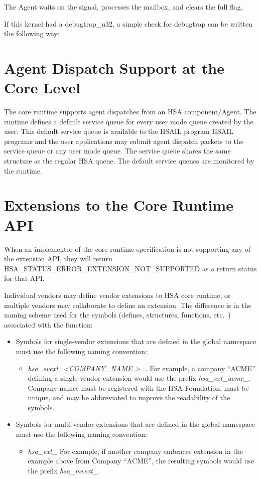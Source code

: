 \documentclass{book}
\newcommand{\reftyp}[1]{#1}
\newcommand{\refenu}[1]{\reftyp{#1}}
\begin{document}
The Agent waits on the signal, processes the mailbox, and clears
the full flag.

If this kernel had a debugtrap\-\_\-u32, a simple check for
debugtrap can be written the following way:




\hypertarget{coreapi_agent}{}\section{Agent Dispatch Support at the
Core Level}\label{coreapi_agent} The core runtime supports agent
dispatches from an HSA component/Agent. The runtime defines a
default service queue for every user mode queue created by the user.
This default service queue is available to the HSAIL program HSAIL
programs and the user applications may submit agent dispatch packets
to the service queue or any user mode queue.  The service queue
shares the same structure as the regular HSA queue.  The default
service queues are monitored by the runtime.



\hypertarget{extensions}{}\section{Extensions to the
Core Runtime API}\label{extensions}

When an implementor of the core runtime specification is not
supporting any of the extension API, they will return
\refenu{HSA\_STATUS\_ERROR\_EXTENSION\_NOT\_SUPPORTED} as a return
status for that API.

Individual vendors may define vendor extensions to HSA core runtime,
or multiple vendors may collaborate to define an extension. The
difference is in the naming scheme used for the symbols (defines,
structures, functions, etc.\ ) associated with the function:

\begin{itemize}
\item Symbols for single-vendor extensions that are defined in the
global namespace must use the following naming convention:
  \begin{itemize}
    \item \emph{hsa\_svext\_\textless COMPANY\_NAME \textgreater\_}.
    For example, a company ``ACME'' defining a single-vendor extension
    would use the prefix \emph{hsa\_ext\_acme\_}. Company names must
    be registered with the HSA Foundation, must be unique, and may be
    abbreviated to improve the readability of the symbols.
  \end{itemize}
\item Symbols for multi-vendor extensions that are defined in the
global namespace must use the following naming convention:
  \begin{itemize}
    \item \emph{hsa\_ext\_} For example, if another company
    embraces extension in the example above from Company ``ACME'', the
    resulting symbols would use the prefix \emph{hsa\_mvext\_}.
  \end{itemize}
\end{itemize}
\end{document}
